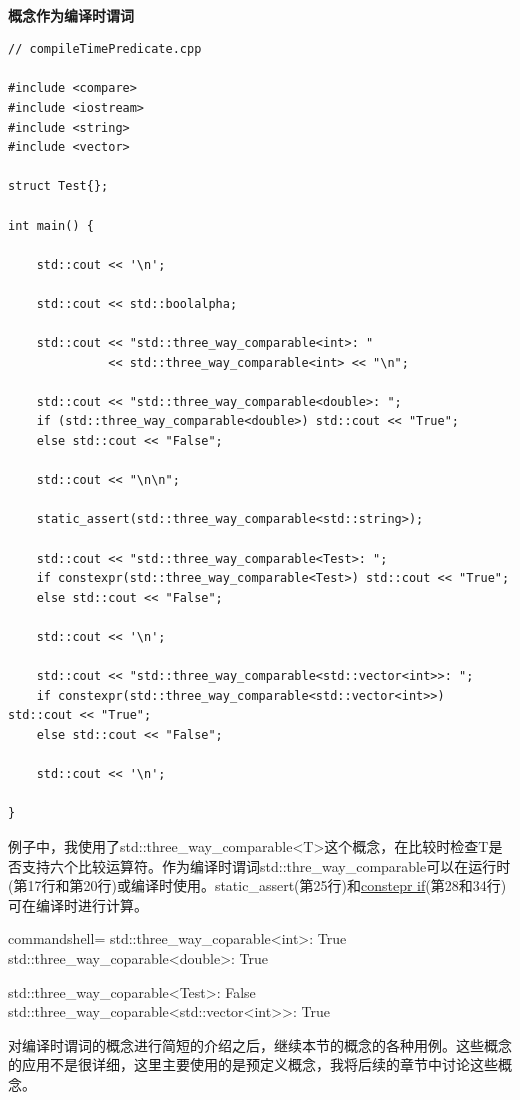 \hspace*{\fill} \\ %
\noindent
\textbf{概念作为编译时谓词}
\begin{lstlisting}[style=styleCXX]
// compileTimePredicate.cpp

#include <compare>
#include <iostream>
#include <string>
#include <vector>

struct Test{};

int main() {

	std::cout << '\n';

	std::cout << std::boolalpha;

	std::cout << "std::three_way_comparable<int>: "
	          << std::three_way_comparable<int> << "\n";

	std::cout << "std::three_way_comparable<double>: ";
	if (std::three_way_comparable<double>) std::cout << "True";
	else std::cout << "False";

	std::cout << "\n\n";

	static_assert(std::three_way_comparable<std::string>);

	std::cout << "std::three_way_comparable<Test>: ";
	if constexpr(std::three_way_comparable<Test>) std::cout << "True";
	else std::cout << "False";

	std::cout << '\n';

	std::cout << "std::three_way_comparable<std::vector<int>>: ";
	if constexpr(std::three_way_comparable<std::vector<int>>) std::cout << "True";
	else std::cout << "False";

	std::cout << '\n';

}
\end{lstlisting}

例子中，我使用了std::three\_way\_comparable<T>这个概念，在比较时检查T是否支持六个比较运算符。作为编译时谓词std::thre\_way\_comparable可以在运行时(第17行和第20行)或编译时使用。static\_assert(第25行)和\href{https://en.cppreference.com/w/cpp/language/if}{constepr if}(第28和34行)可在编译时进行计算。

\begin{tcblisting}{commandshell={}}
std::three_way_coparable<int>: True
std::three_way_coparable<double>: True

std::three_way_coparable<Test>: False
std::three_way_coparable<std::vector<int>>: True
\end{tcblisting}

对编译时谓词的概念进行简短的介绍之后，继续本节的概念的各种用例。这些概念的应用不是很详细，这里主要使用的是预定义概念，我将后续的章节中讨论这些概念。

